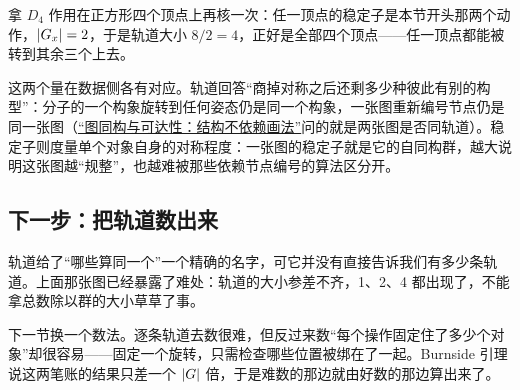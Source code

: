 拿 \(D_4\) 作用在正方形四个顶点上再核一次：任一顶点的稳定子是本节开头那两个动作，\(\left|G_x\right|=2\)，于是轨道大小 \(8/2=4\)，正好是全部四个顶点——任一顶点都能被转到其余三个上去。

这两个量在数据侧各有对应。轨道回答``商掉对称之后还剩多少种彼此有别的构型''：分子的一个构象旋转到任何姿态仍是同一个构象，一张图重新编号节点仍是同一张图（\hyperref[sec:04-Discrete-Mathematics/03-Graph-Theory/10]{``图同构与可达性：结构不依赖画法''}问的就是两张图是否同轨道）。稳定子则度量单个对象自身的对称程度：一张图的稳定子就是它的自同构群，越大说明这张图越``规整''，也越难被那些依赖节点编号的算法区分开。

\subsection{下一步：把轨道数出来}

轨道给了``哪些算同一个''一个精确的名字，可它并没有直接告诉我们有多少条轨道。上面那张图已经暴露了难处：轨道的大小参差不齐，1、2、4 都出现了，不能拿总数除以群的大小草草了事。

下一节换一个数法。逐条轨道去数很难，但反过来数``每个操作固定住了多少个对象''却很容易——固定一个旋转，只需检查哪些位置被绑在了一起。Burnside 引理说这两笔账的结果只差一个 \(\left|G\right|\) 倍，于是难数的那边就由好数的那边算出来了。
